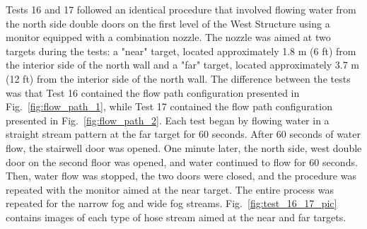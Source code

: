 \documentclass[12pt,oneside]{book}
\begin{document}
Tests 16 and 17 followed an identical procedure that involved flowing water from the north side double doors on the first level of the West Structure using a monitor equipped with a combination nozzle. The nozzle was aimed at two targets during the tests: a "near" target, located approximately 1.8 m (6 ft) from the interior side of the north wall and a "far" target, located approximately 3.7 m (12 ft) from the interior side of the north wall. The difference between the tests was that Test 16 contained the flow path configuration presented in Fig.~\ref{fig:flow_path_1}, while Test 17 contained the flow path configuration presented in Fig.~\ref{fig:flow_path_2}. Each test began by flowing water in a straight stream pattern at the far target for 60 seconds. After 60 seconds of water flow, the stairwell door was opened. One minute later, the north side, west double door on the second floor was opened, and water continued to flow for 60 seconds. Then, water flow was stopped, the two doors were closed, and the procedure was repeated with the monitor aimed at the near target. The entire process was repeated for the narrow fog and wide fog streams. Fig.~\ref{fig:test_16_17_pic} contains images of each type of hose stream aimed at the near and far targets.
\end{document}
